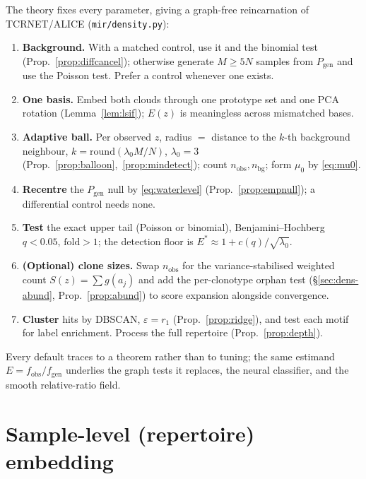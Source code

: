 \documentclass[11pt]{article}
\theoremstyle{oldplain}
\theoremstyle{oldrem}
\newcommand{\Pgen}{P_{\mathrm{gen}}}
\newcommand{\code}[1]{\texttt{#1}}
\begin{document}
The theory fixes every parameter, giving a graph-free reincarnation of {\scshape TCRNET}/{\scshape ALICE}
(\code{mir/density.py}):
\begin{enumerate}\itemsep2pt
\item \textbf{Background.} With a matched control, use it and the binomial test
  (Prop.~\ref{prop:diffcancel}); otherwise generate $M\ge5N$ samples from $\Pgen$ and use the Poisson test.
  Prefer a control whenever one exists.
\item \textbf{One basis.} Embed both clouds through one prototype set and one {\scshape PCA} rotation
  (Lemma~\ref{lem:lsif}); $E(z)$ is meaningless across mismatched bases.
\item \textbf{Adaptive ball.} Per observed $z$, radius $=$ distance to the $k$-th background neighbour,
  $k=\mathrm{round}(\lambda_0 M/N)$, $\lambda_0=3$ (Prop.~\ref{prop:balloon},~\ref{prop:mindetect}); count
  $n_{\mathrm{obs}},n_{\mathrm{bg}}$; form $\mu_0$ by \eqref{eq:mu0}.
\item \textbf{Recentre} the $\Pgen$ null by \eqref{eq:waterlevel} (Prop.~\ref{prop:empnull}); a differential
  control needs none.
\item \textbf{Test} the exact upper tail (Poisson or binomial), Benjamini--Hochberg $q<0.05$,
  $\mathrm{fold}>1$; the detection floor is $E^\ast\approx1+c(q)/\sqrt{\lambda_0}$.
\item \textbf{(Optional) clone sizes.} Swap $n_{\mathrm{obs}}$ for the variance-stabilised weighted count
  $S(z)=\sum g(a_j)$ and add the per-clonotype orphan test (\S\ref{sec:dens-abund},
  Prop.~\ref{prop:abund}) to score expansion alongside convergence.
\item \textbf{Cluster} hits by {\scshape DBSCAN}, $\varepsilon=r_1$ (Prop.~\ref{prop:ridge}), and test each
  motif for label enrichment. Process the full repertoire (Prop.~\ref{prop:depth}).
\end{enumerate}
Every default traces to a theorem rather than to tuning; the same estimand $E=f_{\mathrm{obs}}/f_{\mathrm{gen}}$
underlies the graph tests it replaces, the neural classifier, and the smooth relative-ratio field.

\section{Sample-level (repertoire) embedding}\label{sec:sample}
\end{document}
